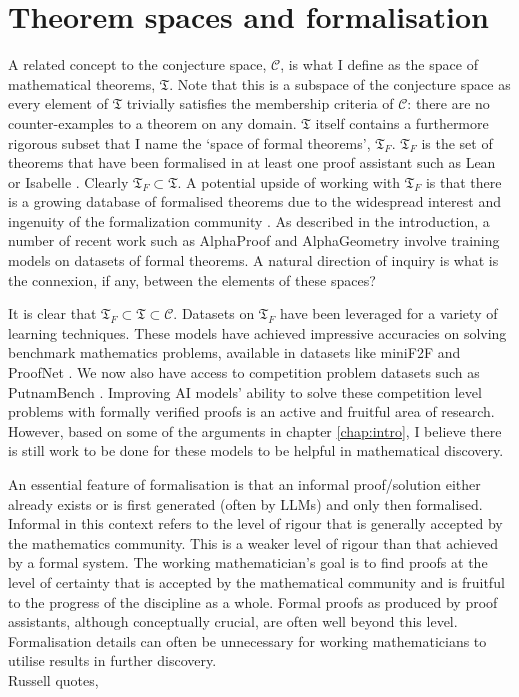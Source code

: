 \section{Theorem spaces and formalisation}
\label{sec:theorem-spaces}
A related concept to the conjecture space, $\mathcal{C}$, is what I define as the space of mathematical theorems, $\mathfrak{T}$. Note that this is a subspace of the conjecture space as every element of $\mathfrak{T}$ trivially satisfies the membership criteria of $\mathcal{C}$:
there are no counter-examples to a theorem on any domain.
$\mathfrak{T}$ itself contains a furthermore rigorous subset that I name the `space of formal theorems', $\mathfrak{T}_F$. $\mathfrak{T}_F$ is the set of theorems that have been formalised in at least one proof assistant such as Lean \cite{LeanCADE2015} or Isabelle \cite{IsabelleHOL}. Clearly $\mathfrak{T}_F\subset\mathfrak{T}$. A potential upside of working with $\mathfrak{T}_F$ is that there is a growing database of formalised theorems due to the widespread interest and ingenuity of the formalization community \cite{mathlib, DiskPaxos-AFP}.
As described in the introduction, a number of recent work such as AlphaProof \cite{AlphaProof} and AlphaGeometry \cite{trinhSolvingOlympiadGeometry2024} involve training models on datasets of formal theorems. A natural direction of inquiry is what is the connexion, if any, between the elements of these spaces?
\par
It is clear that $\mathfrak{T}_F\subset\mathfrak{T}\subset\mathcal{C}$. Datasets on $\mathfrak{T}_F$ have been leveraged for a variety of learning techniques. These models have achieved impressive accuracies on solving benchmark mathematics problems, available in datasets like miniF2F and ProofNet \cite{Minif2f,azerbayev2023proofnetautoformalizingformallyproving}. We now also have access to competition problem datasets such as PutnamBench \cite{tsoukalas2024putnambench}. Improving AI models' ability to solve these competition level problems with formally verified proofs
is an active and fruitful area of research. However, based on some of the arguments in chapter \ref{chap:intro}, I believe there is still work to be done for these models to be helpful in mathematical discovery.
\par
An essential feature of formalisation is that an informal proof/solution either already exists or is first generated (often by LLMs) and only then formalised. Informal in this context refers to the level of rigour that is generally accepted by the mathematics community. This is a weaker level of rigour than that achieved by a formal system. The working mathematician's goal is to find proofs at the level of certainty that is accepted by the mathematical community and is fruitful to the progress of the discipline as a whole. Formal proofs as produced by proof assistants, although conceptually crucial, are often well beyond this level. Formalisation details can often be unnecessary for working mathematicians to utilise results in further discovery.\\ Russell quotes,
